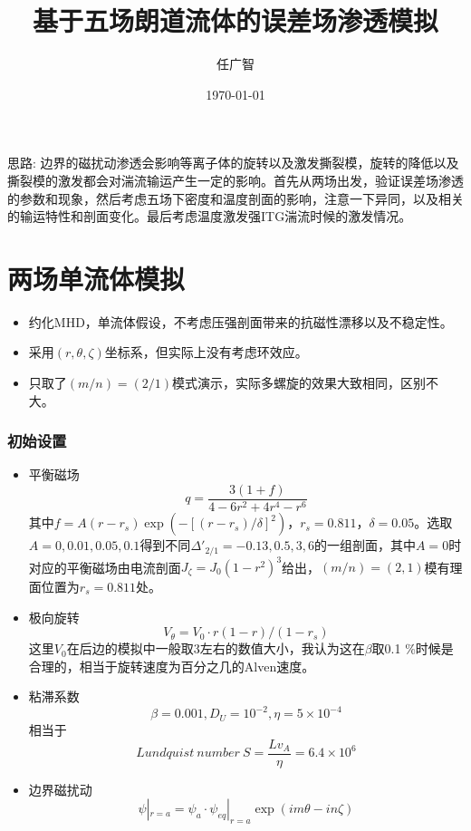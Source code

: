 \documentclass[11pt,a4paper]{article}
\title{基于五场朗道流体的误差场渗透模拟}
\author{任广智}
\date{\today}
\begin{document}
\maketitle

思路: 边界的磁扰动渗透会影响等离子体的旋转以及激发撕裂模，旋转的降低以及撕裂模的激发都会对湍流输运产生一定的影响。首先从两场出发，验证误差场渗透的参数和现象，然后考虑五场下密度和温度剖面的影响，注意一下异同，以及相关的输运特性和剖面变化。最后考虑温度激发强ITG湍流时候的激发情况。
\part{两场单流体模拟}

\begin{itemize}
	\item 约化MHD，单流体假设，不考虑压强剖面带来的抗磁性漂移以及不稳定性。
	\item 采用$(r,\theta,\zeta)$坐标系，但实际上没有考虑环效应。
	\item 只取了$(m/n)=(2/1)$模式演示，实际多螺旋的效果大致相同，区别不大。
\end{itemize}
	
\section{初始设置}
	\begin{itemize}
	\item 平衡磁场
		$$ q = \frac{3(1+f)}{4-6r^2+4r^4-r^6} $$
		其中$f = A(r-r_s)\exp(-[(r-r_s)/\delta]^2)，r_s=0.811，\delta=0.05$。选取$A=0,0.01,0.05,0.1$得到不同$\Delta'_{2/1} = -0.13,0.5,3,6$的一组剖面，其中$A=0$时对应的平衡磁场由电流剖面$J_\zeta=J_0(1-r^2)^3$给出，$(m/n)=(2,1)$模有理面位置为$r_s=0.811$处。
	\item 极向旋转
		$$V_\theta = V_0\cdot r(1-r)/(1-r_s) $$
		这里$V_0$在后边的模拟中一般取3左右的数值大小，我认为这在$\beta$取0.1 \%时候是合理的，相当于旋转速度为百分之几的Alven速度。
	\item 粘滞系数
		$$\beta=0.001,D_U=10^{-2},\eta=5\times10^{-4}$$
		相当于
		$$ Lundquist\ number\ S=\frac{Lv_A}{\eta}=6.4\times{10^6} $$
	\item 边界磁扰动
		$$ \psi|_{r=a} = \psi_a\cdot\psi_{eq}|_{r=a}\exp(im\theta-in\zeta) $$
	\end{itemize}
\end{document}
